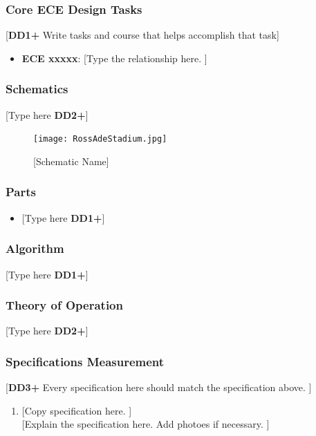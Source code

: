 \documentclass[letterpaper, 11pt]{article}
\begin{document}
\subsubsection{Core ECE Design Tasks}
[\textbf{DD1+} Write tasks and course that helps accomplish that task]
\begin{itemize}
    \item \textbf{ECE xxxxx}: [Type the relationship here. ]
\end{itemize}

\subsubsection{Schematics}
[Type here \textbf{DD2+}]
\begin{figure}[h]
    \centering
    \texttt{[image: RossAdeStadium.jpg]} %
    \caption{[Schematic Name]}
\end{figure} %

\subsubsection{Parts}
\begin{itemize}
    \item {[Type here \textbf{DD1+}]}
\end{itemize}

\subsubsection{Algorithm}
[Type here \textbf{DD1+}]

\subsubsection{Theory of Operation}
[Type here \textbf{DD2+}]
\subsubsection{Specifications Measurement}
[\textbf{DD3+} Every specification here should match the specification above. ]
\begin{enumerate}
    \item {[Copy specification here. ]} \\
          {[Explain the specification here. Add photoes if necessary. ]}
\end{enumerate}
\end{document}
